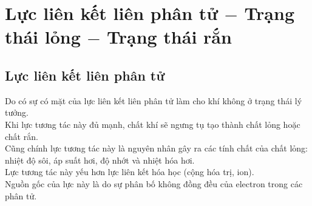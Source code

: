 \chapter{Lực liên kết liên phân tử $-$ Trạng thái lỏng $-$ Trạng thái rắn}
\section{Lực liên kết liên phân tử}
Do có sự có mặt của lực liên kết liên phân tử làm cho khí không ở trạng thái lý tưởng.\\
Khi lực tương tác này đủ mạnh, chất khí sẽ ngưng tụ tạo thành chất lỏng hoặc chất rắn.\\
Cũng chính lực tương tác này là nguyên nhân gây ra các tính chất của chất lỏng: nhiệt độ sôi, áp suất hơi, độ nhớt và nhiệt hóa hơi.\\
Lực tương tác này yếu hơn lực liên kết hóa học (cộng hóa trị, ion).\\
Nguồn gốc của lực này là do sự phân bố không đồng đều của electron trong các phân tử.

